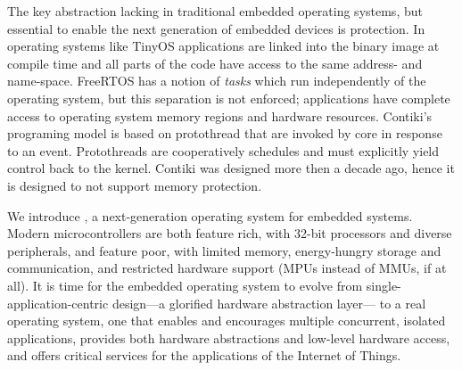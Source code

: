 The key abstraction lacking in traditional embedded operating systems, but
essential to enable the next generation of embedded devices is protection. In
operating systems like TinyOS applications are linked into the
binary image at compile time and all parts of the code have access to the
same address- and name-space. FreeRTOS has a notion of \emph{tasks} which run
independently of the operating system, but this separation is not enforced;
applications have complete access to operating system memory regions and
hardware resources. Contiki's \cite{contiki} programing model is based on
protothread that are invoked by core in response to an event. Protothreads are cooperatively
schedules and must explicitly yield control back to the kernel. Contiki was
designed more then a decade ago, hence it is designed to not support memory
protection.


We introduce \name, a next-generation operating system for embedded systems.
Modern microcontrollers are both feature rich, with 32-bit processors and
diverse peripherals, and feature poor, with limited memory, energy-hungry
storage and communication, and restricted hardware support (MPUs instead of
MMUs, if at all).
%
It is time for the embedded operating system to evolve from single-application-centric
design---a glorified hardware abstraction layer---%
to a real operating system, %
one that enables and encourages multiple concurrent, isolated applications,
provides both hardware abstractions and low-level hardware access, and offers
critical services for the applications of the Internet of Things.


%

